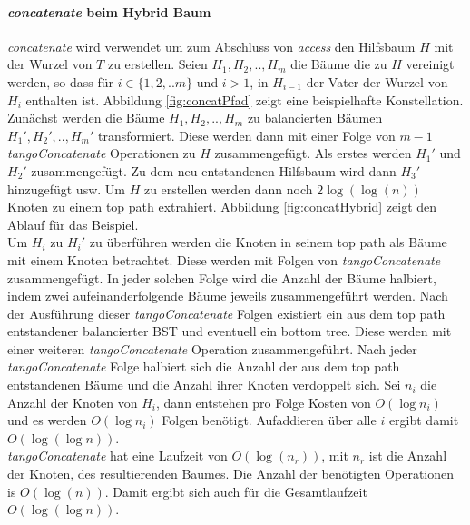 \documentclass[a4paper,12pt]{article}
\begin{document}
\paragraph{\textit{concatenate} beim Hybrid Baum}
\textit{concatenate} wird verwendet um zum Abschluss von \textit{access} den Hilfsbaum $H$ mit der Wurzel von $T$ zu erstellen. Seien $H_1,H_2,..,H_m$ die Bäume die zu $H$ vereinigt werden, so dass für $i \in \{1,2,..m\}$ und $i > 1$, in $H_{i-1}$ der Vater der Wurzel von $H_i$ enthalten ist. Abbildung \ref{fig:concatPfad} zeigt eine beispielhafte Konstellation. Zunächst werden die Bäume $H_1,H_2,..,H_m$ zu balancierten Bäumen $H_1',H_2',..,H_m'$ transformiert. Diese werden dann mit einer Folge von $m-1$ \textit{tangoConcatenate} Operationen zu $H$ zusammengefügt. Als erstes werden $H_1'$ und $H_2'$ zusammengefügt. Zu dem neu entstandenen Hilfsbaum wird dann $H_3'$ hinzugefügt usw.  Um $H$ zu erstellen werden dann noch $2\log\left(\log\left(n\right)\right)$ Knoten zu einem top path extrahiert. Abbildung \ref{fig:concatHybrid} zeigt den Ablauf für das Beispiel.\\
Um $H_i$ zu $H_i'$ zu überführen werden die Knoten in seinem top path als Bäume mit einem Knoten betrachtet. Diese werden mit Folgen von  \textit{tangoConcatenate} zusammengefügt. In jeder solchen Folge wird die Anzahl der Bäume halbiert, indem zwei aufeinanderfolgende Bäume jeweils zusammengeführt werden. Nach der Ausführung dieser \textit{tangoConcatenate} Folgen existiert ein aus dem top path entstandener balancierter BST und eventuell ein bottom tree. Diese werden mit einer weiteren \textit{tangoConcatenate} Operation zusammengeführt. Nach jeder \textit{tangoConcatenate} Folge halbiert sich die Anzahl der aus dem top path entstandenen Bäume und die Anzahl ihrer Knoten verdoppelt sich. Sei $n_i$ die Anzahl der Knoten von $H_i$, dann entstehen pro Folge Kosten von $O\left(\log n_i\right)$ und es werden $O\left(\log n_i\right)$ Folgen benötigt.  Aufaddieren über alle $i$ ergibt damit  $O\left(\log \left( \log n \right)\right)$.  \\
\textit{tangoConcatenate} hat eine Laufzeit von $O\left(\log\left( n_r\right)\right)$, mit $n_r$ ist die Anzahl der Knoten, des resultierenden Baumes. Die Anzahl der benötigten Operationen is $O\left(\log\left(n\right)\right)$. Damit ergibt sich auch für die Gesamtlaufzeit  $O\left(\log \left( \log n \right)\right)$.
 
\end{document}
